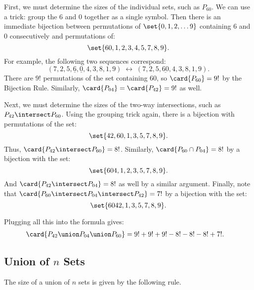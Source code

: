 First, we must determine the sizes of the individual sets, such as
$P_{60}$.  We can use a trick: group the 6 and 0 together as a single
symbol.  Then there is an immediate bijection between permutations of
$\set{0, 1, 2, \dots 9}$ containing 6 and 0 consecutively and
permutations of:
%
\[
\set{60, 1, 2, 3, 4, 5, 7, 8, 9}.
\]
%
For example, the following two sequences correspond:
%
\[
(7, 2, 5, \underline{6}, \underline{0}, 4, 3, 8, 1, 9)
\; \longleftrightarrow \;
(7, 2, 5, \underline{60}, 4, 3, 8, 1, 9).
\]
%
There are $9!$ permutations of the set containing 60, so
$\card{P_{60}} = 9!$ by the Bijection Rule.  Similarly, $\card{P_{04}}
= \card{P_{42}} = 9!$ as well.

Next, we must determine the sizes of the two-way intersections, such
as $P_{42} \intersect P_{60}$.  Using the grouping trick again, there is a
bijection with permutations of the set:
%
\[
\set{42, 60, 1, 3, 5, 7, 8, 9}.
\]
%
Thus, $\card{P_{42} \intersect P_{60}} = 8!$.  Similarly, $\card{P_{60} \cap
P_{04}} = 8!$ by a bijection with the set:
%
\[
\set{604, 1, 2, 3, 5, 7, 8, 9}.
\]
%
And $\card{P_{42} \intersect P_{04}} = 8!$ as well by a similar argument.
Finally, note that $\card{P_{60} \intersect P_{04} \intersect P_{42}} = 7!$ by a
bijection with the set:
%
\[
\set{6042, 1, 3, 5, 7, 8, 9}.
\]

Plugging all this into the formula gives:
%
\begin{align*}
\card{P_{42} \union P_{04} \union P_{60}}
    & = 9! + 9! + 9! - 8! - 8! - 8! + 7!.
\end{align*}

\subsection{Union of $n$ Sets}

The size of a union of $n$ sets is given by the following rule.


